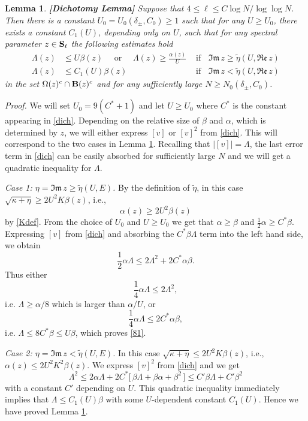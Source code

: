\documentclass[draft]{article}
\newcommand{\wt}{\widetilde}
\newcommand{\al}{\alpha}
\newcommand{\be}{\begin{equation}}
\newcommand{\ee}{\end{equation}}
\newcommand{\barv}{ {[ v ]}}
\newcommand{\re}{{\mathfrak{Re} \, }}
\newcommand{\im}{{\mathfrak{Im} \, }}
\newcommand{\bS}{ {\bf  S}}
\newtheorem{lemma}[theorem]{Lemma}
\numberwithin{equation}{section}
\numberwithin{theorem}{section}
\numberwithin{definition}{section}
\numberwithin{remark}{section}
\begin{document}
\medskip 
\begin{lemma}\label{592}{\bf [Dichotomy Lemma]}    Suppose that 
$4\le \ell\le C\log N/\log\log N$. 
Then there is a  constant $U_0= U_0(\delta_\pm, C_0)\ge 1$
such that
for any $U\ge U_0$,  there exists a constant $C_1(U)$, depending only on $U$,
 such that  for any spectral parameter $z\in \bS_\ell$ the following 
estimates hold
\begin{align}\label{81}
\Lambda(z) & \le   U  \beta(z)   \quad \text{ or }  \quad  \Lambda(z)  \ge  
 \frac {\alpha(z)}{  U }     & \text{ if } \;\; \im z\ge \wt\eta(U,\re z)\\
\Lambda(z) & \le C_1(U) \beta(z)     & \text{ if } \;\;  \im z< \wt\eta(U,\re z)
 \label{82}
\end{align}
 in the set $\Omega(z)^c \cap {\bf B}(z)^c$ and for any sufficiently
large $N\ge N_0(\delta_\pm, C_0)$.


\end{lemma}

{\it Proof.}  We will set $U_0= 9(C^*+1)$ and let $U\ge U_0$ where $C^*$ is the constant appearing in \eqref{dich}.
Depending on the relative size of $\beta$ and $\al$, 
which is determined by $z$, we will 
either express $\barv$ or $\barv^2$ from \eqref{dich}.
This will correspond to the two cases in Lemma \ref{592}.
Recalling that $|\barv|= \Lambda$, the last error term
in \eqref{dich} can be easily absorbed for sufficiently large $N$
 and we will
get a quadratic inequality for $\Lambda$.


\medskip

\noindent
{\it Case 1:  $\eta=\im z \ge \wt\eta(U,E)$.}
By the definition of $\wt\eta$, in this case $\sqrt{\kappa+\eta}\ge 2U^2K\beta(z)$, i.e.,
\be\label{newalz}
\al(z)\ge 2U^2\beta(z)
\ee by \eqref{Kdef}.
 {F}rom the choice of $U_0$ and $U\ge U_0$ we get
that $\alpha  \ge \beta$
and $\frac{1}{2}\al\ge C^*\beta$. Expressing
 $\barv$ from \eqref{dich} and absorbing 
the $C^*\beta\Lambda$ term into the left hand side,
 we obtain
\be\label{13}
\frac{1}{2} \alpha  \Lambda  
 \le   2  \Lambda^2     +  2C^*  \alpha\beta .
\ee
Thus either
$$
   \frac{1}{4} \alpha  \Lambda  
 \le   2  \Lambda^2, 
$$
i.e. $\Lambda\ge \al/8$ which is larger than $\al/U$, or 
$$
   \frac{1}{4} \alpha  \Lambda  
 \le    2C^*  \alpha\beta,
$$
i.e. $\Lambda \le 8C^*\beta \le U\beta$, which proves  \eqref{81}.

\medskip
\noindent
{\it Case 2:  $\eta=\im z < \wt\eta(U,E)$.}
In this case $\sqrt{\kappa+\eta}\le 2U^2K\beta(z)$, i.e.,
$\al(z)\le 2U^2K^2\beta(z)$.
We  express $\barv^2$ from
\eqref{dich} and we get
\be\label{13-2}
 \Lambda^2   \le   2 \alpha \Lambda      + 
 2 C^* \big [ \,  \beta \Lambda  + \beta \alpha + \beta^2  \, \big ]   
 \le  C'   \beta \Lambda  + C'  \beta^2   
\ee
with a constant $C'$ depending on $U$.
This quadratic inequality immediately implies that $\Lambda\le C_1(U)\beta$
with some $U$-dependent constant $C_1(U)$.
Hence we have proved   Lemma \ref{592}.
 
\end{document}
